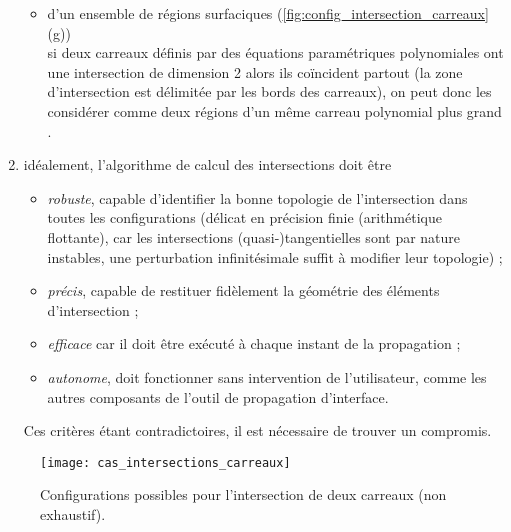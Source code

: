 \begin{enumerate}
\begin{itemize}
		\item d'un ensemble de régions surfaciques (\autoref{fig:config_intersection_carreaux}(g))\\
		si  deux carreaux définis par des équations paramétriques polynomiales ont une intersection de dimension 2 alors ils coïncident partout (la zone d'intersection est délimitée par les bords des carreaux), on peut donc les considérer comme deux régions d'un même carreau polynomial plus grand \cite[Théorème~3]{hu1997}.
	\end{itemize}

	\item idéalement, l'algorithme de calcul des intersections doit être
	\begin{itemize}
		\item \textit{robuste}, \ie capable d'identifier la bonne topologie de l'intersection dans toutes les configurations (délicat en précision finie (arithmétique flottante), car les intersections (quasi-)tangentielles sont par nature instables, \ie une perturbation infinitésimale suffit à modifier leur topologie) ;
		\item \textit{précis}, \ie capable de restituer fidèlement la géométrie des éléments d'intersection ;
		\item \textit{efficace} car il doit être exécuté à chaque instant de la propagation ;
		\item \textit{autonome}, \ie doit fonctionner sans intervention de l'utilisateur, comme les autres composants de l'outil de propagation d'interface.
	\end{itemize}
	Ces critères étant contradictoires, il est nécessaire de trouver un compromis. 
	
\end{enumerate}

\begin{figure}
	\centering
	\texttt{[image: cas\_intersections\_carreaux]}
	\caption{Configurations possibles pour l'intersection de deux carreaux (non exhaustif).}
	\label{fig:config_intersection_carreaux}
\end{figure}



